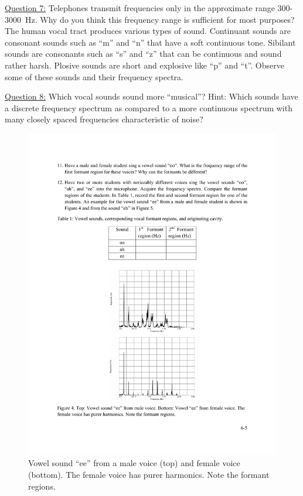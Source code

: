 \documentclass[11pt]{NSF}
\begin{document}
\underline{Question 7:} Telephones transmit frequencies only in the approximate range
300-3000~Hz. Why do you think this frequency range is 
sufficient for most purposes? \\

The human vocal tract produces various types of sound. Continuant sounds are consonant sounds
such as “m” and “n” that have a soft continuous tone. Sibilant sounds are consonants such as “s”
and “z” that can be continuous and sound rather harsh. Plosive sounds are short and explosive
like “p” and “t”. Observe some of these sounds and their frequency spectra.

\underline{Question 8:} Which vocal sounds sound more “musical”? Hint: Which sounds have a discrete frequency
spectrum as compared to a more continuous spectrum with many closely spaced frequencies
characteristic of noise? 
%
\begin{figure}[hbtp]
\begin{center}
\includegraphics[width=.6\textwidth]{fig6_4}
\caption{Vowel sound ``ee” from a male voice (top) and 
female voice (bottom). 
The female voice has purer harmonics. 
Note the formant regions.}
\label{f:4}
\end{center}
\end{figure}
\end{document}
